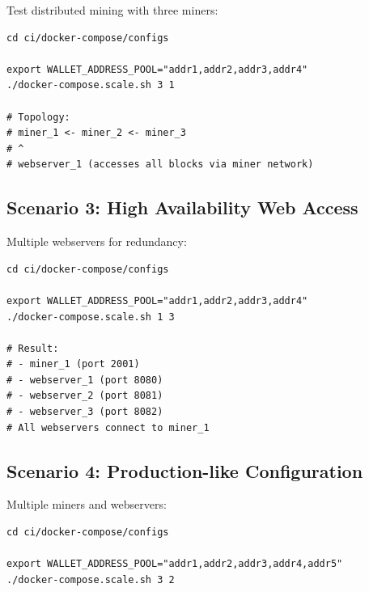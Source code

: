Test distributed mining with three miners:

\begin{listing}[htbp]
\caption{Three Miners + One Webserver}
\label{lst:ch22-scenario-mining}
\begin{verbatim}
cd ci/docker-compose/configs

export WALLET_ADDRESS_POOL="addr1,addr2,addr3,addr4"
./docker-compose.scale.sh 3 1

# Topology:
# miner_1 <- miner_2 <- miner_3
# ^
# webserver_1 (accesses all blocks via miner network)
\end{verbatim}
\end{listing}

\subsection{Scenario 3: High Availability Web Access}

Multiple webservers for redundancy:

\begin{listing}[htbp]
\caption{One Miner + Three Webservers}
\label{lst:ch22-scenario-webservers}
\begin{verbatim}
cd ci/docker-compose/configs

export WALLET_ADDRESS_POOL="addr1,addr2,addr3,addr4"
./docker-compose.scale.sh 1 3

# Result:
# - miner_1 (port 2001)
# - webserver_1 (port 8080)
# - webserver_2 (port 8081)
# - webserver_3 (port 8082)
# All webservers connect to miner_1
\end{verbatim}
\end{listing}

\subsection{Scenario 4: Production-like Configuration}

Multiple miners and webservers:

\begin{listing}[htbp]
\caption{Three Miners + Two Webservers}
\label{lst:ch22-scenario-production}
\begin{verbatim}
cd ci/docker-compose/configs

export WALLET_ADDRESS_POOL="addr1,addr2,addr3,addr4,addr5"
./docker-compose.scale.sh 3 2
\end{verbatim}
\end{listing}


